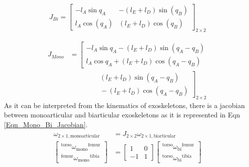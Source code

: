 \documentclass[10pt,letterpaper]{article}
\begin{document}
\begin{gather}\label{Eqn_Bi_Jacobian}
J_{Bi} =
\begin{bmatrix}
-l_{A}\sin{q_{A}}  & -(l_ {E} + l_ {D})\sin (q_ {B})\\
l_ {A}\cos (q_{A}) &  (l_ {E} + l_ {D})\cos (q_ {B})
\end{bmatrix}_{2 \times 2}
\end{gather}

\begin{equation}\label{Eqn_Mono_Jacobian}
\begin{aligned}
J_{Mono}&=
\left[\begin{matrix}
-l_{A}\sin{q_{A}}- (l_ {E} + l_ {D})\sin (q_ {A} - q_ {B})\\
l_{A}\cos{q_{A}} + (l_{E} + l_{D})\cos (q_{A} - q_ {B})
\end{matrix}\right.\\
&\qquad\qquad
\left.\begin{matrix}
{} (l_ {E} + l_ {D})\sin (q_ {A} - q_ {B})\\
{} - (l_ {E} + l_ {D})\cos (q_ {A} - q_ {B})
\end{matrix}\right]_{2\times 2}
\end{aligned}
\end{equation}
As it can be interpreted from the kinematics of exoskeletons, there is a jacobian between monoarticular and biarticular exoskeletons as it is represented in Eqn \ref{Eqn_Mono_Bi_Jacobian}.
\begin{equation}\label{Eqn_Mono_Bi_Jacobian}
\begin{aligned}
\omega_{2\times 1, \mathrm{monoarticular}} &= J_{2\times 2}\omega_{2\times 1, \mathrm{biarticular}}\\
\left\lbrack \begin{array}{c}
{}^{\mathrm{torso}} {\omega_{\mathrm{mono}} }^{\mathrm{femur}} \\
{}^{\mathrm{femur}} {\omega_{\mathrm{mono}} }^{\mathrm{tibia}} 
\end{array}\right\rbrack &=\left\lbrack \begin{array}{cc}
1 & 0\\
-1 & 1
\end{array}\right\rbrack \left\lbrack \begin{array}{c}
{}^{\mathrm{torso}} {\omega_{\mathrm{bi}} }^{\mathrm{femur}} \\
{}^{\mathrm{torso}} {\omega_{\mathrm{bi}} }^{\mathrm{tibia}} 
\end{array}\right\rbrack
\end{aligned}
\end{equation}
\end{document}
